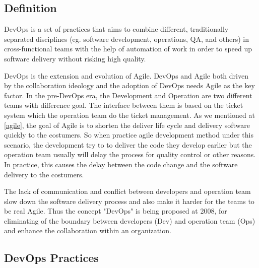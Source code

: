 \subsection{Definition}
DevOps is a set of practices that aims to combine different, traditionally separated disciplines (eg. software development, operations, QA, and others) in cross-functional teams with the help of automation of work in order to speed up software delivery without risking high quality.\cite{bass2015devops}
\par
DevOps is the extension and evolution\cite{lwakatare2016relationship}\cite{leite2019survey} of Agile. DevOps and Agile both driven by the collaboration ideology and the adoption of DevOps needs Agile as the key factor.\cite{lwakatare2016relationship} In the pre-DevOps era, the Development and Operation are two different teams with difference goal.  The interface between them is based on the ticket system which the operation team do the ticket management. As we mentioned at \ref{agile}, the goal of Agile is to shorten the deliver life cycle and delivery software quickly to the costumers. So when practice agile development method under this scenario, the development try to to deliver the code they develop earlier but the operation team usually will delay the process for quality control or other reasons. In practice, this causes the delay between the code change and the software delivery to the costumers\cite{leite2019survey}. 
\par
The lack of communication and conflict between developers and operation team slow down the software delivery process and also make it harder for the teams to be real Agile. Thus the concept "DevOps" is being proposed at 2008, for eliminating of the boundary between developers (Dev) and operation team (Ops) and enhance the collaboration within an organization.
\subsection{DevOps Practices}

